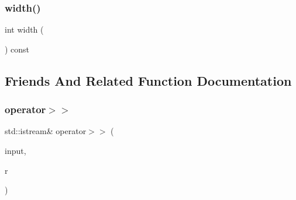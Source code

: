 \mbox{\label{classIntRange2D_ad72663daf610f2a0833a2fc3d78e4fdf}} 
\subsubsection{\texorpdfstring{width()}{width()}}
{\footnotesize\ttfamily int width (\begin{DoxyParamCaption}{ }\end{DoxyParamCaption}) const}



\subsection{Friends And Related Function Documentation}
\mbox{\label{classIntRange2D_a1785cf1b9660abbc492b9fcabe2f7af5}} 
\subsubsection{\texorpdfstring{operator$>$$>$}{operator>>}}
{\footnotesize\ttfamily std\+::istream\& operator$>$$>$ (\begin{DoxyParamCaption}\item[{std\+::istream \&}]{input,  }\item[{\mbox{\hyperlink{classIntRange2D}{Int\+Range2D}} \&}]{r }\end{DoxyParamCaption})\hspace{0.3cm}{\ttfamily [friend]}}


